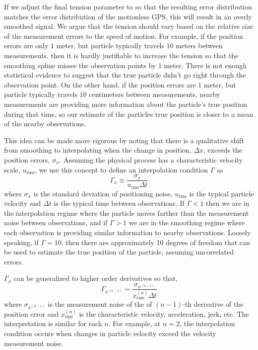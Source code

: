 \documentclass[twocol]{ametsoc}
\begin{document}
If we adjust the final tension parameter to so that the resulting error distribution matches the error distribution of the motionless GPS, this will result in an overly smoothed signal. We argue that the tension should vary based on the relative size of the measurement errors to the speed of motion. For example, if the position errors are only $1$ meter, but particle typically travels $10$ meters between measurements, then it is hardly justifiable to increase the tension so that the smoothing spline misses the observation points by $1$ meter. There is not enough statistical evidence to suggest that the true particle didn't go right through the observation point. On the other hand, if the position errors are  $1$ meter, but particle typically travels $10$ centimeters between measurements, nearby measurements are providing more information about the particle's true position during that time, so our estimate of the particles true position is closer to a mean of the nearby observations.

This idea can be made more rigorous by noting that there is a qualitative shift from smoothing to interpolating when the change in position, $\Delta x$, exceeds the position errors, $\sigma_x$. Assuming the physical process has a characteristic velocity scale, $u_{\textrm{rms}}$, we use this concept to define an interpolation condition $\Gamma$ as
\begin{equation}
\Gamma_x \equiv \frac{\sigma_x}{u_{\textrm{rms}}\Delta t}
\end{equation}
where $\sigma_x$ is the standard deviation of positioning noise, $u_{\textrm{rms}}$ is the typical particle velocity and $\Delta t$ is the typical time between observations. If $\Gamma<1$ then we are in the interpolation regime where the particle moves farther than the measurement noise between observations, and if $\Gamma >1$ we are in the smoothing regime where each observation is providing similar information to nearby observations. Loosely speaking, if $\Gamma=10$, then there are approximately 10 degrees of freedom that can be used to estimate the true position of the particle, assuming uncorrelated errors.

$\Gamma_x$ can be generalized to higher order derivatives so that,
\begin{equation}
\Gamma_{x^{(n-1)}} = \frac{  \sigma_{x^{(n-1)}} }{x^{(n)}_{\textrm{rms}} \Delta t }
\end{equation}
where $\sigma_{x^{(n-1)}}$ is the measurement noise of the of $(n-1)$-th derivative of the position error and $x^{(n)}_{\textrm{rms}}$ is the characteristic velocity, acceleration, jerk, etc. The interpretation is similar for each $n$. For example, at $n=2$, the interpolation condition occurs when changes in particle velocity exceed the velocity measurement noise.
\end{document}
